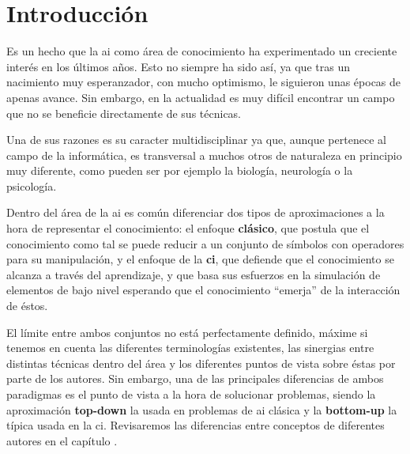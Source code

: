\chapter{Introducción}
\label{ch:intro}

Es un hecho que la \gls{ai} como área de conocimiento ha experimentado un creciente interés en los últimos años. Esto no siempre ha sido así, ya que tras un nacimiento muy esperanzador, con mucho optimismo, le siguieron unas épocas de apenas avance. Sin embargo, en la actualidad es muy difícil encontrar un campo que no se beneficie directamente de sus técnicas.

Una de sus razones es su caracter multidisciplinar ya que, aunque pertenece al campo de la informática, es transversal a muchos otros de naturaleza en principio muy diferente, como pueden ser por ejemplo la biología, neurología o la psicología.

Dentro del área de la \gls{ai} es común diferenciar dos tipos de aproximaciones a la hora de representar el conocimiento: el enfoque \textbf{clásico}, que postula que el conocimiento como tal se puede reducir a un conjunto de símbolos con operadores para su manipulación, y el enfoque de la \textbf{\gls{ci}}, que defiende que el conocimiento se alcanza a través del aprendizaje, y que basa sus esfuerzos en la simulación de elementos de bajo nivel esperando que el conocimiento \enquote{emerja} de la interacción de éstos.

El límite entre ambos conjuntos no está perfectamente definido, máxime si tenemos en cuenta las diferentes terminologías existentes, las sinergias entre distintas técnicas dentro del área y los diferentes puntos de vista sobre éstas por parte de los autores. Sin embargo, una de las principales diferencias de ambos paradigmas es el punto de vista a la hora de solucionar problemas, siendo la aproximación \textbf{top-down} la usada en problemas de \acrshort{ai} clásica y la \textbf{bottom-up} la típica usada en la \acrshort{ci}. Revisaremos las diferencias entre conceptos de diferentes autores en el capítulo .

